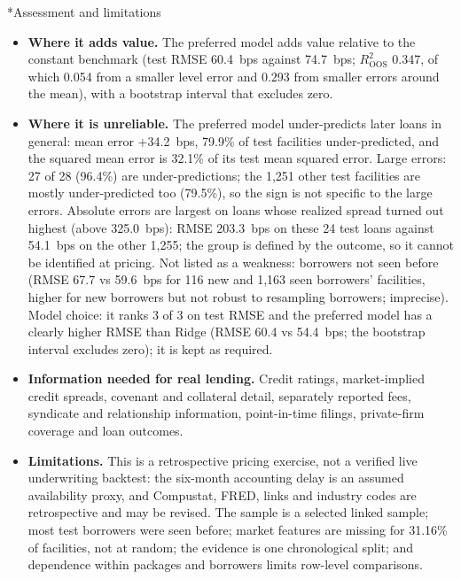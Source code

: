 \documentclass[9pt,letterpaper]{extarticle}
\makeatletter
\renewcommand\subsection{\@startsection{subsection}{2}{\z@}{4pt plus 1pt minus 1pt}{2pt plus 1pt}%
  {\normalfont\normalsize\bfseries\color{navy}}}
\makeatother
\begin{document}
\subsection*{Assessment and limitations}
\begin{itemize}
  \item \textbf{Where it adds value.} The preferred model adds value relative to the constant benchmark (test RMSE 60.4~bps against 74.7~bps; $R^2_{\mathrm{OOS}}$ 0.347, of which 0.054 from a smaller level error and 0.293 from smaller errors around the mean), with a bootstrap interval that excludes zero.
  \item \textbf{Where it is unreliable.} The preferred model under-predicts later loans in general: mean error +34.2~bps, 79.9\% of test facilities under-predicted, and the squared mean error is 32.1\% of its test mean squared error. Large errors: 27 of 28 (96.4\%) are under-predictions; the 1,251 other test facilities are mostly under-predicted too (79.5\%), so the sign is not specific to the large errors. Absolute errors are largest on loans whose realized spread turned out highest (above 325.0~bps): RMSE 203.3~bps on these 24 test loans against 54.1~bps on the other 1,255; the group is defined by the outcome, so it cannot be identified at pricing. Not listed as a weakness: borrowers not seen before (RMSE 67.7 vs 59.6~bps for 116 new and 1,163 seen borrowers' facilities, higher for new borrowers but not robust to resampling borrowers; imprecise). Model choice: it ranks 3 of 3 on test RMSE and the preferred model has a clearly higher RMSE than Ridge (RMSE 60.4 vs 54.4~bps; the bootstrap interval excludes zero); it is kept as required.
  \item \textbf{Information needed for real lending.} Credit ratings, market-implied credit spreads, covenant and collateral detail, separately reported fees, syndicate and relationship information, point-in-time filings, private-firm coverage and loan outcomes.
  \item \textbf{Limitations.} This is a retrospective pricing exercise, not a verified live underwriting backtest: the six-month accounting delay is an assumed availability proxy, and Compustat, FRED, links and industry codes are retrospective and may be revised. The sample is a selected linked sample; most test borrowers were seen before; market features are missing for 31.16\% of facilities, not at random; the evidence is one chronological split; and dependence within packages and borrowers limits row-level comparisons.
\end{itemize}
\end{document}

